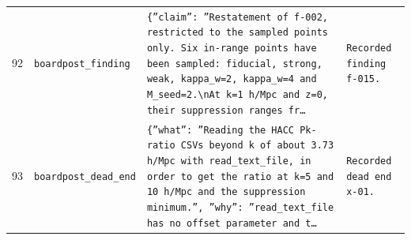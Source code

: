 \documentclass[11pt,a4paper]{article}
\begin{document}
\begin{longtable}{@{}p{}p{}p{}p{}@{}}
92 & \texttt{board}\newline\texttt{post\_\allowbreak{}finding} & \texttt{\{''claim'':\allowbreak{} ''Restatement of f-002,\allowbreak{} restricted to the sampled points only. Six in-range points have been sampled:\allowbreak{} fiducial,\allowbreak{} strong,\allowbreak{} weak,\allowbreak{} kappa\_\allowbreak{}w=\allowbreak{}2,\allowbreak{} kappa\_\allowbreak{}w=\allowbreak{}4 and M\_\allowbreak{}seed=\allowbreak{}2.\textbackslash{}\allowbreak{}nAt k=\allowbreak{}1 h/\allowbreak{}Mpc and z=\allowbreak{}0,\allowbreak{} their suppression ranges fr\ldots{}\allowbreak{}} & \texttt{Recorded finding f-015.} \\
93 & \texttt{board}\newline\texttt{post\_\allowbreak{}dead\_\allowbreak{}end} & \texttt{\{''what'':\allowbreak{} ''Reading the HACC Pk-ratio CSVs beyond k of about 3.73 h/\allowbreak{}Mpc with read\_\allowbreak{}text\_\allowbreak{}file,\allowbreak{} in order to get the ratio at k=\allowbreak{}5 and 10 h/\allowbreak{}Mpc and the suppression minimum.'',\allowbreak{} ''why'':\allowbreak{} ''read\_\allowbreak{}text\_\allowbreak{}file has no offset parameter and t\ldots{}\allowbreak{}} & \texttt{Recorded dead end x-01.} \\
\bottomrule\end{longtable}
\end{document}
